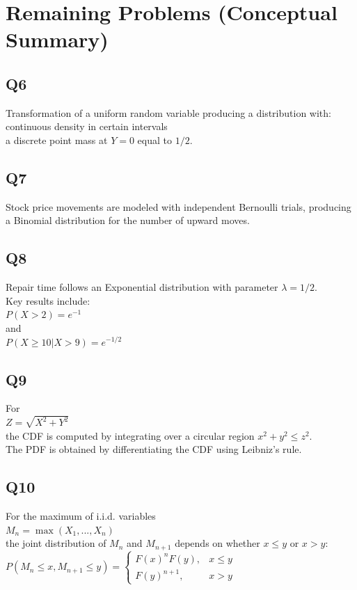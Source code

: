 \documentclass{article}
\begin{document}
\section{Remaining Problems (Conceptual Summary)}

\subsection{Q6}
Transformation of a uniform random variable producing a distribution with: \\
continuous density in certain intervals \\
a discrete point mass at $Y=0$ equal to $1/2$.

\subsection{Q7}
Stock price movements are modeled with independent Bernoulli trials, producing a Binomial distribution for the number of upward moves.

\subsection{Q8}
Repair time follows an Exponential distribution with parameter $\lambda = 1/2$. \\
Key results include: \\
$P(X>2)=e^{-1}$ \\
and \\
$P(X\ge10|X>9)=e^{-1/2}$

\subsection{Q9}
For \\
$Z=\sqrt{X^2+Y^2}$ \\
the CDF is computed by integrating over a circular region $x^2+y^2 \le z^2$. \\
The PDF is obtained by differentiating the CDF using Leibniz's rule.

\subsection{Q10}
For the maximum of i.i.d. variables \\
$M_n=\max(X_1,...,X_n)$ \\
the joint distribution of $M_n$ and $M_{n+1}$ depends on whether $x\le y$ or $x>y$: \\
$P(M_n\le x,M_{n+1}\le y)= \begin{cases} F(x)^nF(y), & x\le y \\ F(y)^{n+1}, & x>y \end{cases}$
\end{document}
